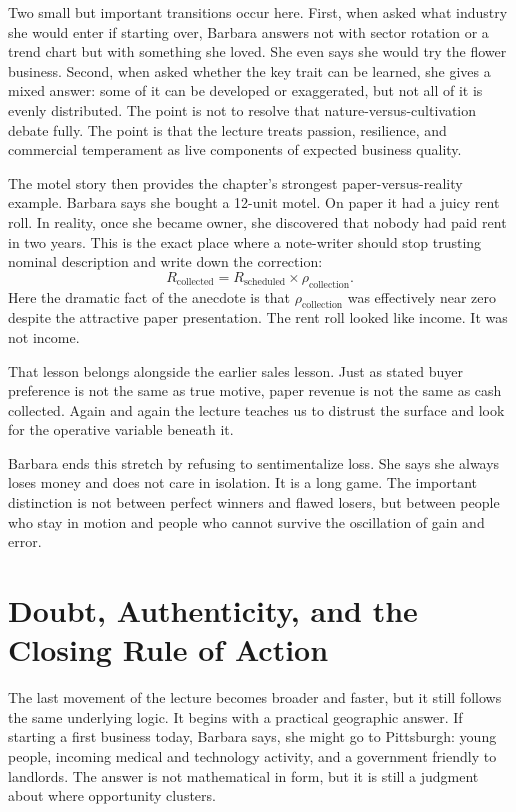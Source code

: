 Two small but important transitions occur here. First, when asked what industry she would enter if starting over, Barbara answers not with sector rotation or a trend chart but with something she loved. She even says she would try the flower business. Second, when asked whether the key trait can be learned, she gives a mixed answer: some of it can be developed or exaggerated, but not all of it is evenly distributed. The point is not to resolve that nature-versus-cultivation debate fully. The point is that the lecture treats passion, resilience, and commercial temperament as live components of expected business quality.

The motel story then provides the chapter's strongest paper-versus-reality example. Barbara says she bought a 12-unit motel. On paper it had a juicy rent roll. In reality, once she became owner, she discovered that nobody had paid rent in two years. This is the exact place where a note-writer should stop trusting nominal description and write down the correction:
\begin{equation}
R_{\text{collected}}=R_{\text{scheduled}}\times \rho_{\text{collection}}.
\end{equation}
Here the dramatic fact of the anecdote is that \(\rho_{\text{collection}}\) was effectively near zero despite the attractive paper presentation. The rent roll looked like income. It was not income.

That lesson belongs alongside the earlier sales lesson. Just as stated buyer preference is not the same as true motive, paper revenue is not the same as cash collected. Again and again the lecture teaches us to distrust the surface and look for the operative variable beneath it.

Barbara ends this stretch by refusing to sentimentalize loss. She says she always loses money and does not care in isolation. It is a long game. The important distinction is not between perfect winners and flawed losers, but between people who stay in motion and people who cannot survive the oscillation of gain and error.

\section{Doubt, Authenticity, and the Closing Rule of Action}

The last movement of the lecture becomes broader and faster, but it still follows the same underlying logic. It begins with a practical geographic answer. If starting a first business today, Barbara says, she might go to Pittsburgh: young people, incoming medical and technology activity, and a government friendly to landlords. The answer is not mathematical in form, but it is still a judgment about where opportunity clusters.

